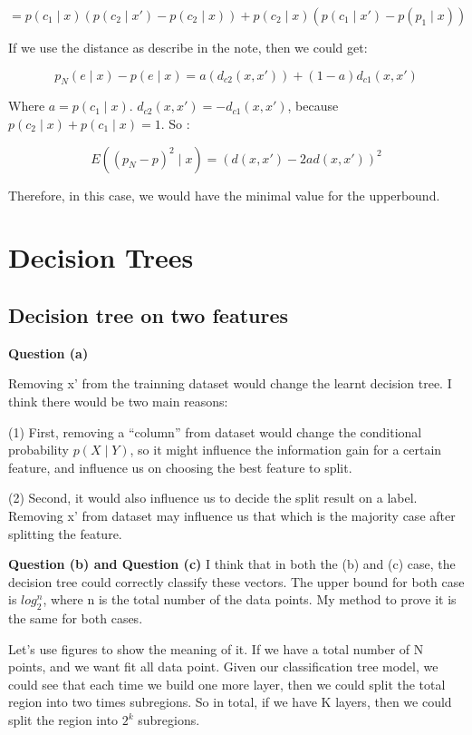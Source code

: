 \documentclass{article} %
\begin{document}
\begin{equation}
= p(c_1 \mid x) (p(c_2 \mid x') - p(c_2 \mid x))
+ p(c_2 \mid x) (p(c_1 \mid x') - p(p_1 \mid x))
\end{equation}

If we use the distance as describe in the note, then we could get:

\begin{equation}
p_N(e \mid x) - p(e \mid x)
= a (d_{c2}(x, x'))
+ (1-a) {d_{c1}(x,x')}
\end{equation}

Where $a = p(c_1 \mid x)$. $d_{c2}(x, x') = -d_{c1}(x,x')$, because
$p(c_2 \mid x) + p(c_1 \mid x) = 1$. So :

\begin{equation}
E((p_N - p)^2 \mid x) = (d(x,x') -2ad(x,x'))^2
\end{equation}

Therefore, in this case, we would have the minimal value for the upperbound.



\section{Decision Trees}


\subsection{Decision tree on two features}
\textbf{Question (a)}

Removing x' from the trainning dataset would change the learnt decision tree. I
think there would be two main reasons:

(1) First, removing a ``column'' from dataset would change the conditional
probability $p(X \mid Y)$, so it might influence the information gain for a certain
feature, and influence us on choosing the best feature to split.

(2) Second, it would also influence us to decide the split result on a label.
Removing x' from dataset may influence us that which is the majority case after
splitting the feature.

\textbf{Question (b) and Question (c)}
I think that in both the (b) and (c) case, the decision tree could correctly
classify these vectors. The upper bound for both case is $log_2^n$, where n is
the total number of the data points. My method to prove it is the same for both
cases.

Let's use figures to show the meaning of it. If we have a total number of N
points, and we want fit all data point. Given our classification tree model, we
could see that each time we build one more layer, then we could split the total
region into two times subregions. So in total, if we have K layers, then we
could split the region into $2^k$ subregions.
\end{document}
